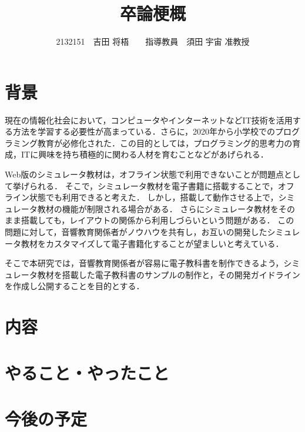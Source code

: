 \documentclass[twocolumn,10pt,a4j]{ltjsarticle}
\title{卒論梗概}
\author{2132151　吉田 将梧　　指導教員　須田 宇宙 准教授}
\date{}
\begin{document}
\maketitle

\section{背景}

現在の情報化社会において，コンピュータやインターネットなどIT技術を活用する方法を学習する必要性が高まっている．さらに，2020年から小学校でのプログラミング教育が必修化された．この目的としては，プログラミング的思考力の育成，ITに興味を持ち積極的に関わる人材を育むことなどがあげられる．






Web版のシミュレータ教材は，オフライン状態で利用できないことが問題点として挙げられる．
そこで，シミュレータ教材を電子書籍に搭載することで，オフライン状態でも利用できると考えた．
しかし，搭載して動作させる上で，シミュレータ教材の機能が制限される場合がある．
さらにシミュレータ教材をそのまま搭載しても，レイアウトの関係から利用しづらいという問題がある．
この問題に対して，音響教育関係者がノウハウを共有し，お互いの開発したシミュレータ教材をカスタマイズして電子書籍化することが望ましいと考えている．

そこで本研究では，音響教育関係者が容易に電子教科書を制作できるよう，シミュレータ教材を搭載した電子教科書のサンプルの制作と，その開発ガイドラインを作成し公開することを目的とする．

\section{内容}


\section{やること・やったこと}





\section{今後の予定}
\end{document}
